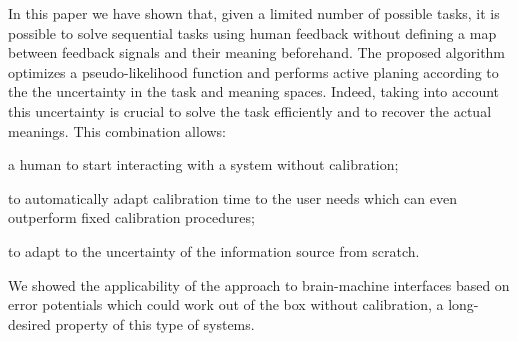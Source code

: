 In this paper we have shown that, given a limited number of possible tasks, it is possible to solve sequential tasks using human feedback without defining a map between feedback signals and their meaning beforehand. The proposed algorithm optimizes a pseudo-likelihood function and performs active planing according to the the uncertainty in the task and meaning spaces. Indeed, taking into account this uncertainty is crucial to solve the task efficiently and to recover the actual meanings. This combination allows: 
\begin{inparaenum}[a)]
\item a human to start interacting with a system without calibration;
\item to automatically adapt calibration time to the user needs which can even outperform fixed calibration procedures; 
\item to adapt to the uncertainty of the information source from scratch.
\end{inparaenum}
We showed the applicability of the approach to brain-machine interfaces based on error potentials which could work out of the box without calibration, a long-desired property of this type of systems. 



